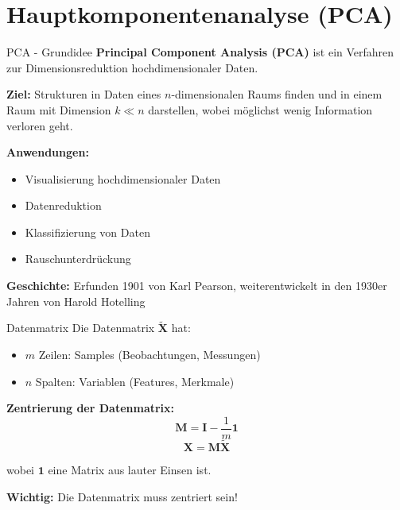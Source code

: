 \documentclass[a4paper, fontsize=7pt]{scrartcl}
\begin{document}
\section{Hauptkomponentenanalyse (PCA)}

\begin{mainbox}{PCA - Grundidee}
\textbf{Principal Component Analysis (PCA)} ist ein Verfahren zur Dimensionsreduktion hochdimensionaler Daten.

\textbf{Ziel:} Strukturen in Daten eines $n$-dimensionalen Raums finden und in einem Raum mit Dimension $k \ll n$ darstellen, wobei möglichst wenig Information verloren geht.

\textbf{Anwendungen:}
\begin{itemize}
    \item Visualisierung hochdimensionaler Daten
    \item Datenreduktion
    \item Klassifizierung von Daten
    \item Rauschunterdrückung
\end{itemize}

\textbf{Geschichte:} Erfunden 1901 von Karl Pearson, weiterentwickelt in den 1930er Jahren von Harold Hotelling
\end{mainbox}

\begin{mainbox}{Datenmatrix}
Die Datenmatrix $\tilde{\mathbf{X}}$ hat:
\begin{itemize}
    \item $m$ Zeilen: Samples (Beobachtungen, Messungen)
    \item $n$ Spalten: Variablen (Features, Merkmale)
\end{itemize}

\textbf{Zentrierung der Datenmatrix:}
$$\mathbf{M} = \mathbf{I} - \frac{1}{m}\mathbf{1}$$
$$\mathbf{X} = \mathbf{M}\tilde{\mathbf{X}}$$

wobei $\mathbf{1}$ eine Matrix aus lauter Einsen ist.

\textbf{Wichtig:} Die Datenmatrix muss zentriert sein!
\end{mainbox}
\end{document}
